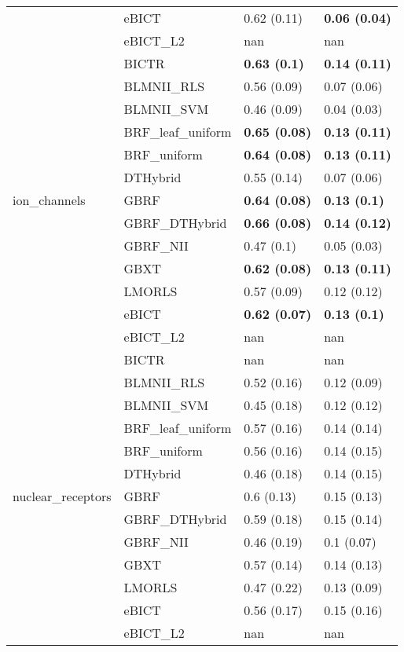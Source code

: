 \begin{tabular}{llll}
 & eBICT & 0.62 (0.11) & \textbf{0.06 (0.04)} \\
 & eBICT\_L2 & nan & nan \\
\cline{1-2}
\multirow[c]{13}{*}{ion\_channels} & BICTR & \textbf{0.63 (0.1)} & \textbf{0.14 (0.11)} \\
 & BLMNII\_RLS & 0.56 (0.09) & 0.07 (0.06) \\
 & BLMNII\_SVM & 0.46 (0.09) & 0.04 (0.03) \\
 & BRF\_leaf\_uniform & \textbf{0.65 (0.08)} & \textbf{0.13 (0.11)} \\
 & BRF\_uniform & \textbf{0.64 (0.08)} & \textbf{0.13 (0.11)} \\
 & DTHybrid & 0.55 (0.14) & 0.07 (0.06) \\
 & GBRF & \textbf{0.64 (0.08)} & \textbf{0.13 (0.1)} \\
 & GBRF\_DTHybrid & \textbf{0.66 (0.08)} & \textbf{0.14 (0.12)} \\
 & GBRF\_NII & 0.47 (0.1) & 0.05 (0.03) \\
 & GBXT & \textbf{0.62 (0.08)} & \textbf{0.13 (0.11)} \\
 & LMORLS & 0.57 (0.09) & 0.12 (0.12) \\
 & eBICT & \textbf{0.62 (0.07)} & \textbf{0.13 (0.1)} \\
 & eBICT\_L2 & nan & nan \\
\cline{1-2}
\multirow[c]{13}{*}{nuclear\_receptors} & BICTR & nan & nan \\
 & BLMNII\_RLS & 0.52 (0.16) & 0.12 (0.09) \\
 & BLMNII\_SVM & 0.45 (0.18) & 0.12 (0.12) \\
 & BRF\_leaf\_uniform & 0.57 (0.16) & 0.14 (0.14) \\
 & BRF\_uniform & 0.56 (0.16) & 0.14 (0.15) \\
 & DTHybrid & 0.46 (0.18) & 0.14 (0.15) \\
 & GBRF & 0.6 (0.13) & 0.15 (0.13) \\
 & GBRF\_DTHybrid & 0.59 (0.18) & 0.15 (0.14) \\
 & GBRF\_NII & 0.46 (0.19) & 0.1 (0.07) \\
 & GBXT & 0.57 (0.14) & 0.14 (0.13) \\
 & LMORLS & 0.47 (0.22) & 0.13 (0.09) \\
 & eBICT & 0.56 (0.17) & 0.15 (0.16) \\
 & eBICT\_L2 & nan & nan \\
\cline{1-2}
\bottomrule
\end{tabular}
